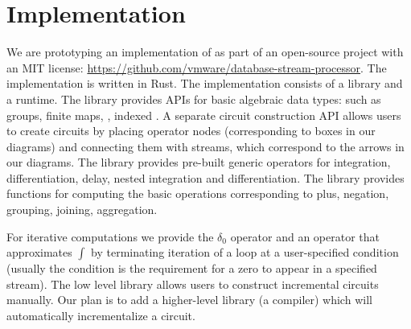 \section{Implementation}\label{sec:implementation}

We are prototyping an implementation of \dbsp as part of an
open-source project with an MIT license: 
\url{https://github.com/vmware/database-stream-processor}.
The implementation is written in Rust.
The implementation consists of a library and a runtime.
The library provides APIs for basic algebraic data types:
such as groups, finite maps, \zr, indexed \zr.  
A separate circuit construction API allows users to 
create \dbsp circuits by placing operator nodes (corresponding to boxes in our diagrams)
and connecting them with streams, which correspond to the
arrows in our diagrams.  The library provides pre-built generic operators
for integration, differentiation, delay, nested integration and differentiation.
The \zr library provides functions for computing the basic \zr operations
corresponding to plus, negation, grouping, joining, aggregation.

For iterative computations we provide the $\delta_0$ operator and
an operator that approximates $\int$ by terminating iteration of
a loop at a user-specified condition (usually the condition is the 
requirement for a zero to appear in a specified stream).
The low level library allows users to construct incremental
circuits manually.  Our plan is to add a higher-level library
(a compiler) which will automatically incrementalize a circuit.

